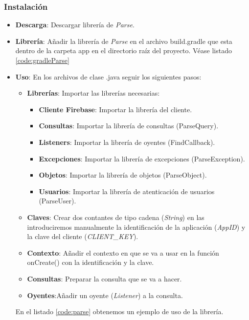 	\subsubsection{Instalación}
	\begin{itemize}
		\item {\bf Descarga}: Descargar librería de {\it Parse}.
		\item {\bf Librería}: Añadir la librería de {\it Parse} en el archivo {\ttfamily build.gradle} que esta dentro de la carpeta {\ttfamily app} en el directorio raíz del proyecto. Véase listado \ref{code:gradleParse}

		
		\newpage
		
		\item {\bf Uso}: En los archivos de clase {\ttfamily  .java}\cite{14:java:online} seguir los siguientes pasos:
		\begin{itemize}
			\item {\bf Librerías}: Importar las librerías necesarias:
			\begin{itemize}
				\item {\bf Cliente Firebase}: Importar la librería del cliente.
				\item {\bf Consultas}: Importar la librería de consultas ({\ttfamily ParseQuery}).
				\item {\bf Listeners}: Importar la librería de oyentes ({\ttfamily FindCallback}).
				\item {\bf Excepciones}: Importar la librería de excepciones ({\ttfamily ParseException}).
				\item {\bf Objetos}: Importar la librería de objetos ({\ttfamily ParseObject}).
				\item {\bf Usuarios}: Importar la librería de atenticación de usuarios ({\ttfamily ParseUser}).
			\end{itemize}
			\item {\bf Claves}: Crear dos contantes de tipo cadena ({\it String}) en las introduciremos manualmente la identificación de la aplicación ({\it AppID}) y la clave del cliente ({\it CLIENT\_KEY}).
			\item {\bf Contexto}: Añadir el contexto en que se va a usar en la función {\ttfamily onCreate()} con la identificación y la clave.
			\item {\bf Consultas}: Preparar la consulta que se va a hacer.
			\item {\bf Oyentes}:Añadir un oyente ({\it Listener}) a la consulta.
		\end{itemize}
		
		En el listado \ref{code:parse} obtenemos un ejemplo de uso de la librería.
		
		\newpage
		\noindent
		
	\end{itemize}
		

